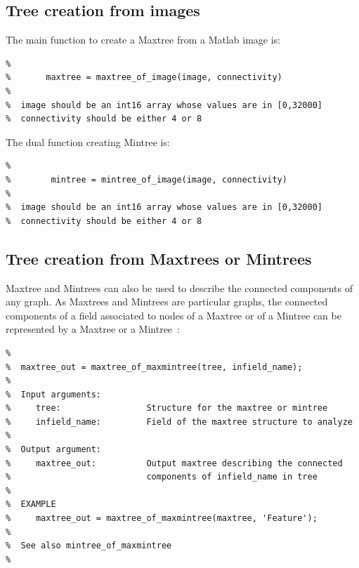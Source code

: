 \documentclass[DIV=calc, paper=a4, fontsize=11pt]{scrartcl}	 %
\begin{document}
\subsection{Tree creation from images}
The main function to create a Maxtree from a Matlab image is: 
\begin{lstlisting}[aboveskip=0.5 \baselineskip]
%  Compute the maxtree of of an image
%
%		maxtree = maxtree_of_image(image, connectivity)
%
%  image should be an int16 array whose values are in [0,32000]
%  connectivity should be either 4 or 8 
\end{lstlisting}

\noindent The dual function creating Mintree is: 
\begin{lstlisting}[aboveskip=0.5 \baselineskip]
%  Compute the mintree of an image
%
%        mintree = mintree_of_image(image, connectivity)
%  
%  image should be an int16 array whose values are in [0,32000]
%  connectivity should be either 4 or 8 
\end{lstlisting}

\subsection{Tree creation from Maxtrees or Mintrees}
Maxtree and Mintrees can also be used to describe the connected components of any graph.
As Maxtrees and Mintrees are particular graphs, the connected components of a field 
associated to nodes of a Maxtree or of a Mintree can be represented by a Maxtree or a Mintree~\cite{Xu-TPAMI-2015}: 

\begin{lstlisting}[aboveskip=0.5 \baselineskip]
%  maxtree_of_maxmintree computes the maxtree of a maxtree or a mintree
%
%  maxtree_out = maxtree_of_maxmintree(tree, infield_name);
%
%  Input arguments:
%     tree:              	Structure for the maxtree or mintree
%     infield_name:         Field of the maxtree structure to analyze
%
%  Output argument:
%     maxtree_out:          Output maxtree describing the connected
%                           components of infield_name in tree
%
%  EXAMPLE
%     maxtree_out = maxtree_of_maxmintree(maxtree, 'Feature');
%
%  See also mintree_of_maxmintree
%
\end{lstlisting}
\end{document}

